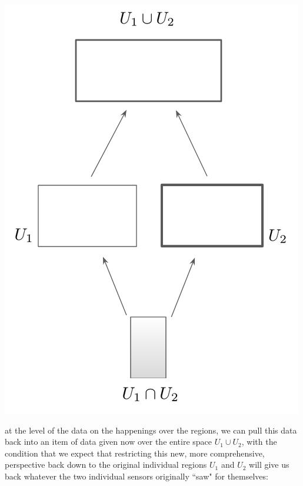 \documentclass[a4paper]{book}
\theoremstyle{definition}
\theoremstyle{definition}
\theoremstyle{definition}
\theoremstyle{theorem}
\theoremstyle{definition}
\begin{document}
	\begin{center}
		\includegraphics[scale=0.25]{UnderlyingSpaceDiagram.png}
	\end{center}
	at the level of the data on the happenings over the regions, we can pull this data back into an item of data given now over the entire space $U_1 \cup U_2$, with the condition that we expect that restricting this new, more comprehensive, perspective back down to the original individual regions $U_1$ and $U_2$ will give us back whatever the two individual sensors originally ``saw" for themselves: 
\end{document}
